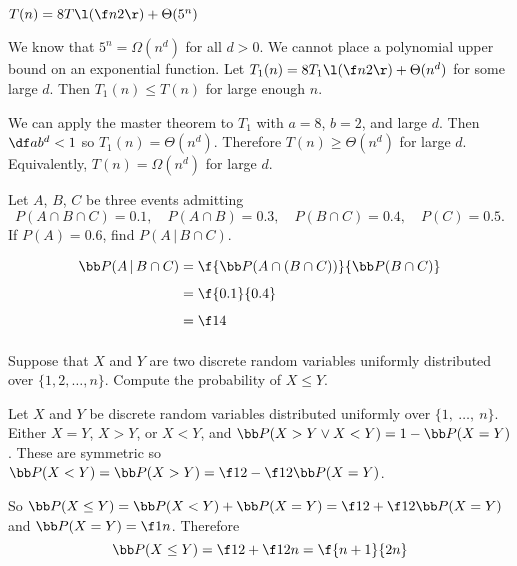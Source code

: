 \documentclass[a4paper]{article}
\begin{document}
\begin{questionbody}
$T(n) = 8T\l(\f n2\r) + \Theta(5^n)$
\end{questionbody}

We know that $5^n = \Omega(n^d)$ for all $d > 0$. We cannot place a polynomial upper bound on an exponential function. Let $T_1(n) = 8T_1\l(\f n2\r) + \Theta(n^d)$ for some large $d$. Then $T_1(n) \le T(n)$ for large enough $n$.

We can apply the master theorem to $T_1$ with $a=8$, $b=2$, and large $d$. Then $\df a{b^d} < 1$ so $T_1(n) = \Theta(n^d)$. Therefore $T(n) \ge \Theta(n^d)$ for large $d$. Equivalently, $T(n) = \Omega(n^d)$ for large $d$.


\begin{questionbody}
Let $A$, $B$, $C$ be three events admitting \[
P(A \cap B \cap C) = 0.1, \quad P(A \cap B) = 0.3, \quad P(B \cap C) = 0.4, \quad P(C) = 0.5.
\]
If $P(A) = 0.6$, find $P(A \,|\, B \cap C)$.
\end{questionbody}

\begin{align*}
\bb P(A \,|\, B \cap C) &= \f{\bb P(A \cap (B \cap C))}{\bb P(B \cap C)}\\[1ex]
&= \f{0.1}{0.4}\\[1ex]
&= \f14\\[1ex]
\end{align*}


\begin{questionbody}
Suppose that $X$ and $Y$ are two discrete random variables uniformly distributed over $\{1, 2, \dotsc, n\}$. Compute the probability of $X \le Y$.
\end{questionbody}

Let $X$ and $Y$ be discrete random variables distributed uniformly over $\{1,\ \ldots,\ n\}$. Either $X = Y$, $X > Y$, or $X < Y$, and $\bb P(X > Y \lor X < Y) = 1 - \bb P(X = Y)$. These are symmetric so $\bb P(X < Y) = \bb P(X > Y) = \f12 - \f12 \bb P(X = Y)$.

So $\bb P(X \le Y) = \bb P(X < Y) + \bb P(X = Y) = \f12  + \f12 \bb P(X = Y)$ and $\bb P(X = Y) = \f1n$. Therefore $$\bb P(X \le Y) = \f12 + \f1{2n} = \f{n + 1}{2n}$$

%


\end{document}
